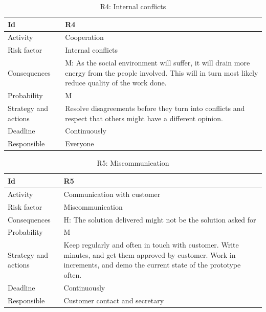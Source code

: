 \documentclass[11pt]{book}
\begin{document}
\begin{table}[H]
\centering
\begin{tabular}{ l  p{11cm} }
	Id						& R4 																		\\ \hline
	Activity				& Cooperation 														\\ \hline
	Risk factor				& Internal conflicts 														\\ \hline
	Consequences			& M: As the social environment will suffer, it will drain more energy from 
								the people involved. This will in turn most likely reduce quality of 
								the work done. 															\\ \hline
	Probability				& M 																		\\ \hline
	Strategy and actions	& Resolve disagreements before they turn into conflicts and respect that 
								others might have a different opinion. 									\\ \hline
	Deadline				& Continuously 																\\ \hline
	Responsible				& Everyone 																	\\ 
\end{tabular}
\label{tab:risk_4}
\caption{R4: Internal conflicts}
\end{table}

\begin{table}[H]
\centering
\begin{tabular}{ l  p{11cm} }
	Id						& R5 																		\\ \hline
	Activity				& Communication with customer 												\\ \hline
	Risk factor				& Miscommunication 															\\ \hline
	Consequences			& H: The solution delivered might not be the solution asked for 			\\ \hline
	Probability				& M 																		\\ \hline
	Strategy and actions	& Keep regularly and often in touch with customer. Write minutes, and get 
								them approved by customer. Work in increments, and demo the current 
								state of the prototype often. 											\\ \hline
	Deadline				& Continuously 																\\ \hline
	Responsible				& Customer contact and secretary 											\\ 
\end{tabular}
\label{tab:risk_5}
\caption{R5: Miscommunication}
\end{table}
\end{document}

